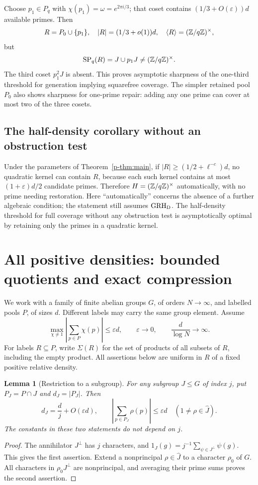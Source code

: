 \documentclass[11pt,a4paper]{article}
\newtheorem{lemma}[theorem]{Lemma}
\theoremstyle{definition}
\theoremstyle{remark}
\begin{document}
Choose $p_1\in P_q$ with $\chi(p_1)=\omega=e^{2\pi i/3}$;
that coset contains $(1/3+O(\varepsilon))d$ available primes. Then
\[
 R=P_0\cup\{p_1\},\quad |R|=(1/3+o(1))d,\quad
 \langle R\rangle=(\mathbb Z/q\mathbb Z)^\times,
\]
but
\[
 \operatorname{SP}_q(R)=J\cup p_1J\ne(\mathbb Z/q\mathbb Z)^\times.
\]
The third coset $p_1^2J$ is absent. This proves asymptotic sharpness
of the one-third threshold for generation implying squarefree coverage.
The simpler retained pool $P_0$ also shows sharpness for one-prime
repair: adding any one prime can cover at most two of the three cosets.

\subsection{The half-density corollary without an obstruction test}
Under the parameters of Theorem~\ref{p-thm:main}, if
$|R|\ge(1/2+\ell^{-c})d$, no quadratic kernel can contain $R$, because
each such kernel contains at most $(1+\varepsilon)d/2$ candidate primes.
Therefore $H=(\mathbb Z/q\mathbb Z)^\times$ automatically, with no prime needing restoration.
Here ``automatically'' concerns the absence of a further algebraic
condition; the statement still assumes $\mathrm{GRH}_{\mathrm D}$.
The half-density threshold for full coverage without any obstruction
test is asymptotically optimal by retaining only the primes in a
quadratic kernel.



\section{All positive densities: bounded quotients and exact compression}

We work with a family of finite abelian groups $G$, of orders $N\to\infty$,
and labelled pools $P$, of sizes $d$. Different labels may carry the same
group element. Assume
\begin{equation}\label{p-eq:ad-balanced}
 \max_{\chi\ne1}\left|\sum_{p\in P}\chi(p)\right|\leq\varepsilon d,
 \qquad \varepsilon\longrightarrow0,
 \qquad \frac d{\log N}\longrightarrow\infty.
\end{equation}
For labels $R\subseteq P$, write $\Sigma(R)$ for the set of products of
all subsets of $R$, including the empty product. All assertions below
are uniform in $R$ of a fixed positive relative density.

\begin{lemma}[Restriction to a subgroup]\label{p-lem:subgroup-restriction}
For any subgroup $J\leq G$ of index $j$, put $P_J=P\cap J$ and
$d_J=|P_J|$. Then
\[
 d_J=\frac dj+O(\varepsilon d),
 \qquad
 \left|\sum_{p\in P_J}\rho(p)\right|\leq\varepsilon d
 \quad(1\ne\rho\in\widehat J).
\]
The constants in these two statements do not depend on $j$.
\end{lemma}
\begin{proof}
The annihilator $J^\perp$ has $j$ characters, and
$1_J(g)=j^{-1}\sum_{\psi\in J^\perp}\psi(g)$. This gives the first
assertion. Extend a nonprincipal $\rho\in\widehat J$ to a character
$\rho_0$ of $G$. All characters in $\rho_0J^\perp$ are nonprincipal,
and averaging their prime sums proves the second assertion.
\end{proof}
\end{document}
